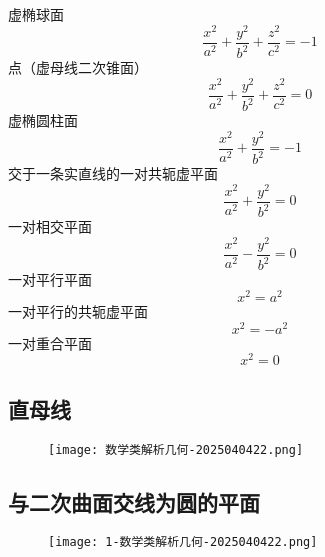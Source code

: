 虚椭球面
\[
\frac{x^2}{a^2}+\frac{y^2}{b^2}+\frac{z^2}{c^2}=-1
\]
点（虚母线二次锥面）
\[
\frac{x^2}{a^2}+\frac{y^2}{b^2}+\frac{z^2}{c^2}=0
\]
虚椭圆柱面
\[
\frac{x^2}{a^2}+\frac{y^2}{b^2}=-1
\]
交于一条实直线的一对共轭虚平面
\[
\frac{x^2}{a^2}+\frac{y^2}{b^2}=0
\]
一对相交平面
\[
\frac{x^2}{a^2}-\frac{y^2}{b^2}=0
\]
一对平行平面
\[
x^2=a^2
\]
一对平行的共轭虚平面
\[
x^2=-a^2
\]
一对重合平面
\[
x^2=0
\]
\subsection{直母线}

\begin{figure}[H]
\centering
\texttt{[image: 数学类解析几何-2025040422.png]}
\label{}
\end{figure}

\subsection{与二次曲面交线为圆的平面}

\begin{figure}[H]
\centering
\texttt{[image: 1-数学类解析几何-2025040422.png]}
\label{}
\end{figure}
